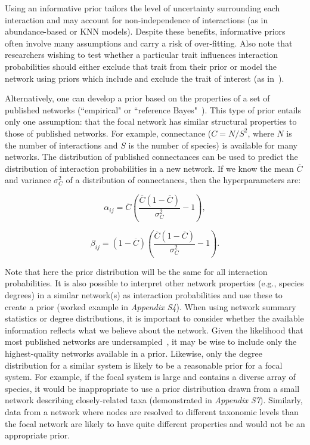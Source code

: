 \documentclass[12pt]{article}
\begin{document}
\begin{spacing}{2.0}
        Using an informative prior tailors the level of uncertainty surrounding each interaction and may account for non-independence of interactions (as in abundance-based or KNN models). Despite these benefits, informative priors often involve many assumptions and carry a risk of over-fitting. Also note that researchers wishing to test whether a particular trait influences interaction probabilities should either exclude that trait from their prior or model the network using priors which include and exclude the trait of interest (as in~\citet{Weinstein2017,Weinstein2017a}).


        Alternatively, one can develop a prior based on the properties of a set of published networks (``empirical" or ``reference Bayes"~\citet{Spiegelhalter2000}). This type of prior entails only one assumption: that the focal network has similar structural properties to those of published networks. For example, connectance ($C=N/S^2$, where $N$ is the number of interactions and $S$ is the number of species) is available for many networks. The distribution of published connectances can be used to predict the distribution of interaction probabilities in a new network. If we know the mean $\overline{C}$ and variance $\sigma_C^2$ of a distribution of connectances, then the hyperparameters are:

        \begin{equation}
        \alpha_{ij}=\overline{C}(\frac{\overline{C}(1-\overline{C})}{\sigma_C^2}-1) ,
        \end{equation}

        \begin{equation}
        \beta_{ij}=(1-\overline{C})(\frac{\overline{C}(1-\overline{C})}{\sigma_C^2}-1) .
        \end{equation}
  

        Note that here the prior distribution will be the same for all interaction probabilities. It is also possible to interpret other network properties (e.g., species degrees) in a similar network(s) as interaction probabilities and use these to create a prior (worked example in \emph{Appendix S4}). When using network summary statistics or degree distributions, it is important to consider whether the available information reflects what we believe about the network. Given the likelihood that most published networks are undersampled~\citep{Jordano2016}, it may be wise to include only the highest-quality networks available in a prior. Likewise, only the degree distribution for a similar system is likely to be a reasonable prior for a focal system. For example, if the focal system is large and contains a diverse array of species, it would be inappropriate to use a prior distribution drawn from a small network describing closely-related taxa (demonstrated in \emph{Appendix S7}). Similarly, data from a network where nodes are resolved to different taxonomic levels than the focal network are likely to have quite different properties and would not be an appropriate prior.



\end{spacing}
\end{document}
